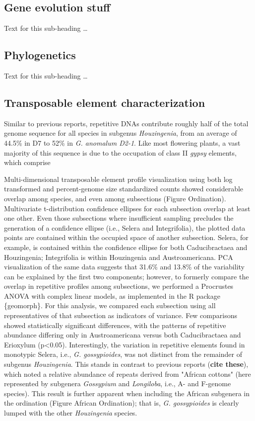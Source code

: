 \documentclass{bmcart}
\begin{document}
\subsection*{Gene evolution stuff}
Text for this sub-heading \ldots

\subsection*{Phylogenetics}
Text for this sub-heading \ldots

\subsection*{Transposable element characterization}
Similar to previous reports, repetitive DNAs contribute roughly half of the total genome sequence for all species in subgenus \textit{Houzingenia}, from an average of 44.5\% in D7 to 52\% in \textit{G. anomalum D2-1}. Like most flowering plants, a vast majority of this sequence is due to the occupation of class II \textit{gypsy} elements, which comprise 

Multi-dimensional transposable element profile visualization using both log transformed and percent-genome size standardized counts showed considerable overlap among species, and even among subsections (Figure Ordination). Multivariate t-distribution confidence ellipses for each subsection overlap at least one other. Even those subsections where insufficient sampling precludes the generation of a confidence ellipse (i.e., Selera and Integrifolia), the plotted data points are contained within the occupied space of another subsection. Selera, for example, is contained within the confidence ellipse for both Caducibractaea and Houzingenia; Integrifolia is within Houzingenia and Austroamericana. PCA visualization of the same data suggests that 31.6\% and 13.8\% of the variability can be explained by the first two components; however, to formerly compare the overlap in repetitive profiles among subsections, we performed a Procrustes ANOVA with complex linear models, as implemented in the R package \{geomorph\}. For this analysis, we compared each subsection using all representatives of that subsection as indicators of variance. Few comparisons showed statistically significant differences, with the patterns of repetitive abundance differing only in Austroamericana versus both Caducibractaea and Erioxylum (p<0.05). Interestingly, the variation in repetitive elements found in monotypic Selera, i.e., \textit{G. gossypioides}, was not distinct from the remainder of subgenus \textit{Houzingenia}. This stands in contrast to previous reports (\textbf{cite these}), which noted a relative abundance of repeats derived from "African cottons" (here represented by subgenera \textit{Gossypium} and \textit{Longiloba}, i.e., A- and F-genome species). This result is further apparent when including the African subgenera in the ordination (Figure African Ordination); that is, \textit{G. gossypioides} is clearly lumped with the other \textit{Houzingenia} species. 
\end{document}
